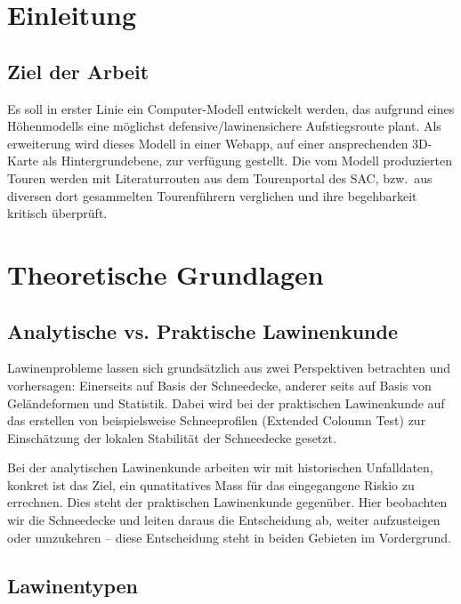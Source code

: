 
\section{Einleitung}

\subsection{Ziel der Arbeit}

Es soll in erster Linie ein Computer-Modell entwickelt werden, das aufgrund eines Höhenmodells eine möglichst defensive/lawinensichere Aufstiegsroute plant. Als erweiterung wird dieses Modell in einer Webapp, auf einer ansprechenden 3D-Karte als Hintergrundebene, zur verfügung gestellt. Die vom Modell produzierten Touren werden mit Literaturrouten aus dem Tourenportal des SAC, bzw.\ aus diversen dort gesammelten Tourenführern verglichen und ihre begehbarkeit kritisch überprüft.

\section{Theoretische Grundlagen}
\subsection{Analytische vs. Praktische Lawinenkunde}
Lawinenprobleme lassen sich grundsätzlich aus zwei Perspektiven betrachten und vorhersagen: Einerseits auf Basis der Schneedecke, anderer seits auf Basis von Geländeformen und Statistik.
Dabei wird bei der praktischen Lawinenkunde auf das erstellen von beispielsweise Schneeprofilen (Extended Coloumn Test) zur Einschätzung der lokalen Stabilität der Schneedecke gesetzt.

Bei der analytischen Lawinenkunde arbeiten wir mit historischen Unfalldaten, konkret ist das Ziel, ein qunatitatives Mass für das eingegangene Riskio zu errechnen.
Dies steht der praktischen Lawinenkunde gegenüber. Hier beobachten wir die Schneedecke und leiten daraus die Entscheidung ab, weiter aufzusteigen oder umzukehren – diese Entscheidung steht in beiden Gebieten im Vordergrund.

\subsection{Lawinentypen}


